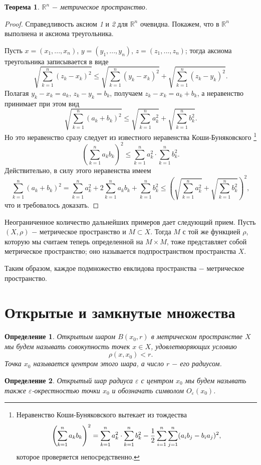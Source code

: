 \documentclass{article}
\newtheorem{theorem}{Теорема}[section]
\newtheorem{definition}{Определение}[section]
\begin{document}
\begin{theorem}
\(\mathbb{R}^n\) \(-\) метрическое пространство.
\end{theorem}

\begin{proof}
Справедливость аксиом \textit{1} и \textit{2} для \(\mathbb{R}^n\) очевидна. Покажем, что в \(\mathbb{R}^n\) выполнена и аксиома треугольника.

Пусть \(x = (x_1, ..., x_n)\), \(y = (y_1, ..., y_n)\), \(z = (z_1, ..., z_n)\); тогда аксиома треугольника записывается в виде
\[
\sqrt{\sum_{k = 1}^{n}(z_k - x_k)^2} \leq \sqrt{\sum_{k = 1}^{n}(y_k - x_k)^2} + \sqrt{\sum_{k = 1}^{n}(z_k - y_k)^2}.
\]
Полагая \(y_k - x_k = a_k\), \(z_k - y_k = b_k\), получаем \(z_k - x_k = a_k + b_k\), а неравенство принимает при этом вид
\[
\sqrt{\sum_{k = 1}^{n}(a_k + b_k)^2} \leq \sqrt{\sum_{k = 1}^{n}a_k^2} + \sqrt{\sum_{k = 1}^{n}b_k^2}.
\]
Но это неравенство сразу следует из известного неравенства Коши-Буняковского
\footnote{
Неравенство Коши-Буняковского вытекает из тождества
\[
\left(\sum_{k = 1}^{n}a_k{b_k}\right)^2 = \sum_{k = 1}^{n}a_k^2 \cdot \sum_{k = 1}^{n}b_k^2 - {1 \over 2}\sum_{i = 1}^{n}\sum_{j = 1}^{n}(a_ib_j - b_ia_j)^2,
\]
которое проверяется непосредственно.
}
\[
\left(\sum_{k = 1}^{n}a_k{b_k}\right)^2 \leq \sum_{k = 1}^{n}a_k^2 \cdot \sum_{k = 1}^{n}b_k^2.
\]
Действительно, в силу этого неравенства имеем
\[
\sum_{k = 1}^{n}(a_k + b_k)^2 = \sum_{k = 1}^{n}a_k^2 + 2 \sum_{k = 1}^{n}a_k{b_k} + \sum_{k = 1}^{n}b_k^2 \leq \left(\sqrt{\sum_{k = 1}^{n}a_k^2} + \sqrt{\sum_{k = 1}^{n}b_k^2}\right)^2,
\]
что и требовалось доказать.
\end{proof}

Неограниченное количество дальнейших примеров дает следующий прием. Пусть \((X, \rho)\) \(-\) метрическое пространство и \(M \subset X\). Тогда \(M\) с той же функцией \(\rho\), которую мы считаем теперь определенной на \(M \times M\), тоже представляет собой метрическое пространство; оно называется подпространством пространства \(X\).

Таким образом, каждое подмножество евклидова пространства \(-\) метрическое пространство.

\section{Открытые и замкнутые множества}

\begin{definition}
Открытым шаром \(B(x_0, r)\) в метрическом пространстве \(X\) мы будем называть совокупность точек \(x \in X\), удовлетворяющих условию
\[
\rho(x, x_0) < r.
\]
Точка \(x_0\) называется центром этого шара, а число \(r\) \(-\) его радиусом.
\end{definition}

\begin{definition}
Открытый шар радиуса \(\varepsilon\) с центром \(x_0\) мы будем называть также \(\varepsilon\)-окрестностью точки \(x_0\) и обозначать символом \(O_\varepsilon(x_0)\).
\end{definition}
\end{document}
